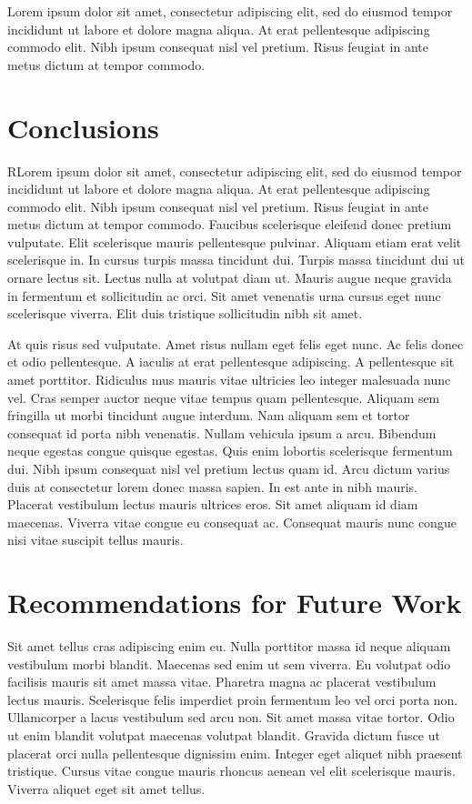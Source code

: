Lorem ipsum dolor sit amet, consectetur adipiscing elit, sed do eiusmod tempor incididunt ut labore et dolore magna aliqua. At erat pellentesque adipiscing commodo elit. Nibh ipsum consequat nisl vel pretium. Risus feugiat in ante metus dictum at tempor commodo. 

\section{Conclusions}

RLorem ipsum dolor sit amet, consectetur adipiscing elit, sed do eiusmod tempor incididunt ut labore et dolore magna aliqua. At erat pellentesque adipiscing commodo elit. Nibh ipsum consequat nisl vel pretium. Risus feugiat in ante metus dictum at tempor commodo. Faucibus scelerisque eleifend donec pretium vulputate. Elit scelerisque mauris pellentesque pulvinar. Aliquam etiam erat velit scelerisque in. In cursus turpis massa tincidunt dui. Turpis massa tincidunt dui ut ornare lectus sit. Lectus nulla at volutpat diam ut. Mauris augue neque gravida in fermentum et sollicitudin ac orci. Sit amet venenatis urna cursus eget nunc scelerisque viverra. Elit duis tristique sollicitudin nibh sit amet.


At quis risus sed vulputate. Amet risus nullam eget felis eget nunc. Ac felis donec et odio pellentesque. A iaculis at erat pellentesque adipiscing. A pellentesque sit amet porttitor. Ridiculus mus mauris vitae ultricies leo integer malesuada nunc vel. Cras semper auctor neque vitae tempus quam pellentesque. Aliquam sem fringilla ut morbi tincidunt augue interdum. Nam aliquam sem et tortor consequat id porta nibh venenatis. Nullam vehicula ipsum a arcu. Bibendum neque egestas congue quisque egestas. Quis enim lobortis scelerisque fermentum dui. Nibh ipsum consequat nisl vel pretium lectus quam id. Arcu dictum varius duis at consectetur lorem donec massa sapien. In est ante in nibh mauris. Placerat vestibulum lectus mauris ultrices eros. Sit amet aliquam id diam maecenas. Viverra vitae congue eu consequat ac. Consequat mauris nunc congue nisi vitae suscipit tellus mauris.

\section{Recommendations for Future Work}

Sit amet tellus cras adipiscing enim eu. Nulla porttitor massa id neque aliquam vestibulum morbi blandit. Maecenas sed enim ut sem viverra. Eu volutpat odio facilisis mauris sit amet massa vitae. Pharetra magna ac placerat vestibulum lectus mauris. Scelerisque felis imperdiet proin fermentum leo vel orci porta non. Ullamcorper a lacus vestibulum sed arcu non. Sit amet massa vitae tortor. Odio ut enim blandit volutpat maecenas volutpat blandit. Gravida dictum fusce ut placerat orci nulla pellentesque dignissim enim. Integer eget aliquet nibh praesent tristique. Cursus vitae congue mauris rhoncus aenean vel elit scelerisque mauris. Viverra aliquet eget sit amet tellus.

